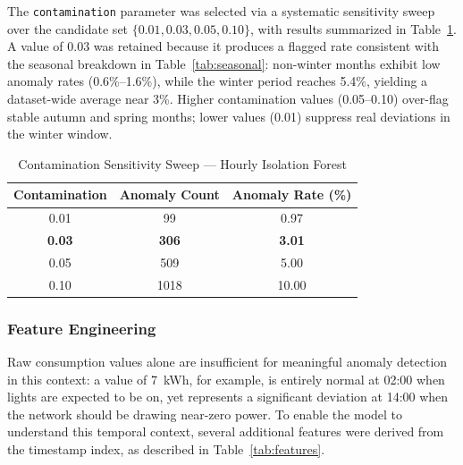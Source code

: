 \documentclass{article}
\begin{document}
The \texttt{contamination} parameter was selected via a systematic
sensitivity sweep over the candidate set $\{0.01, 0.03, 0.05, 0.10\}$,
with results summarized in Table~\ref{tab:contamination_sweep}. A value
of 0.03 was retained because it produces a flagged rate consistent with
the seasonal breakdown in Table~\ref{tab:seasonal}: non-winter months
exhibit low anomaly rates (0.6\%--1.6\%), while the winter period reaches
5.4\%, yielding a dataset-wide average near 3\%. Higher contamination
values (0.05--0.10) over-flag stable autumn and spring months; lower
values (0.01) suppress real deviations in the winter window.
 
\begin{table}[h]
\centering
\caption{Contamination Sensitivity Sweep --- Hourly Isolation Forest}
\label{tab:contamination_sweep}
\begin{tabular}{ccc}
\hline
\textbf{Contamination} & \textbf{Anomaly Count} & \textbf{Anomaly Rate (\%)} \\
\hline
0.01 &   99 & 0.97 \\
\textbf{0.03} & \textbf{306} & \textbf{3.01} \\
0.05 &  509 & 5.00 \\
0.10 & 1018 & 10.00 \\
\hline
\end{tabular}
\end{table}

\subsubsection{Feature Engineering}

Raw consumption values alone are insufficient for meaningful anomaly
detection in this context: a value of 7~kWh, for example, is entirely
normal at 02:00 when lights are expected to be on, yet represents a
significant deviation at 14:00 when the network should be drawing
near-zero power. To enable the model to understand this temporal
context, several additional features were derived from the timestamp
index, as described in Table~\ref{tab:features}.
\end{document}
